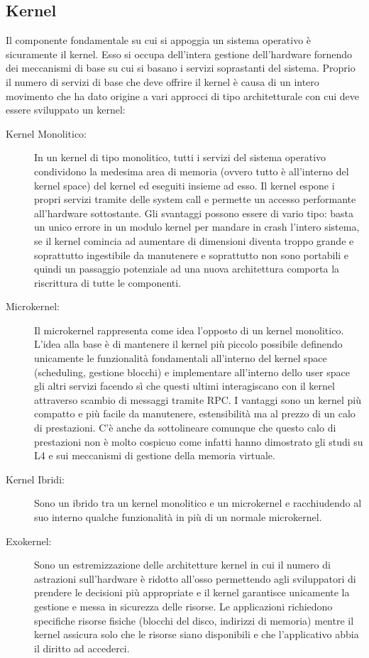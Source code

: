 \subsection{Kernel}
Il componente fondamentale su cui si appoggia un sistema operativo è sicuramente il kernel. Esso si occupa dell'intera gestione dell'hardware fornendo dei meccanismi di base su cui si basano i servizi soprastanti del sistema. Proprio il numero di servizi di base che deve offrire il kernel è causa di un intero movimento che ha dato origine a vari approcci di tipo architetturale con cui deve essere sviluppato un kernel:
\begin{description}
  \item[Kernel Monolitico:] In un kernel di tipo monolitico, tutti i servizi del sistema operativo condividono la medesima area di memoria (ovvero tutto è all'interno del kernel space) del kernel ed eseguiti insieme ad esso. Il kernel espone i propri servizi tramite delle system call e permette un accesso performante all'hardware sottostante. Gli svantaggi possono essere di vario tipo: basta un unico errore in un modulo kernel per mandare in crash l'intero sistema, se il kernel comincia ad aumentare di dimensioni diventa troppo grande e soprattutto ingestibile da manutenere e soprattutto non sono portabili e quindi un passaggio potenziale ad una nuova architettura comporta la riscrittura di tutte le componenti.
  \item[Microkernel:] Il microkernel rappresenta come idea l'opposto di un kernel monolitico. L'idea alla base è di mantenere il kernel più piccolo possibile definendo unicamente le funzionalità fondamentali all'interno del kernel space (scheduling, gestione blocchi) e implementare all'interno dello user space gli altri servizi facendo sì che questi ultimi  interagiscano con il kernel attraverso scambio di messaggi tramite RPC. I vantaggi sono un kernel più compatto e più facile da manutenere, estensibilità ma al prezzo di un calo di prestazioni. C'è anche da sottolineare comunque che questo calo di prestazioni non è molto cospicuo come infatti hanno dimostrato gli studi su L4\cite{hartig97} e sui meccanismi di gestione della memoria virtuale\cite{rashid88,appel91}.
  \item[Kernel Ibridi:] Sono un ibrido tra un kernel monolitico e un microkernel e racchiudendo al suo interno qualche funzionalità in più di un normale microkernel.
  \item[Exokernel:] Sono un estremizzazione delle architetture kernel in cui il numero di astrazioni sull'hardware è ridotto all'osso permettendo agli sviluppatori di prendere le decisioni più appropriate e il kernel garantisce unicamente la gestione e messa in sicurezza delle risorse. Le applicazioni richiedono specifiche risorse fisiche (blocchi del disco, indirizzi di memoria) mentre il kernel assicura solo che le risorse siano disponibili e che l'applicativo abbia il diritto ad accederci.\cite{engler94}
\end{description}
